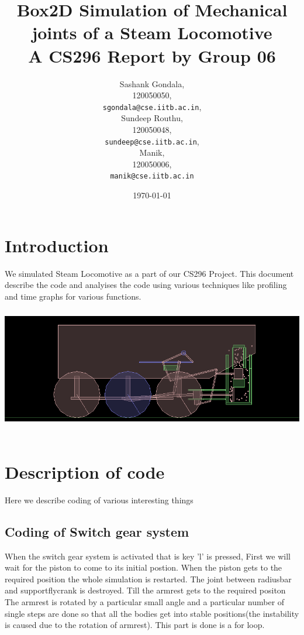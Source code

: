 \documentclass[11pt]{article}
\begin{document}
\title{Box2D Simulation of Mechanical joints of a Steam Locomotive \\ A CS296 Report by Group 06}
\author{Sashank Gondala,\\
	120050050,\\
	\texttt{sgondala@cse.iitb.ac.in},\\
	Sundeep Routhu,\\
	120050048,\\
	\texttt{sundeep@cse.iitb.ac.in},\\
	Manik,\\
	120050006,\\
	\texttt{manik@cse.iitb.ac.in}}
\date{\today}
\maketitle
\pagebreak
\section{Introduction}
We simulated Steam Locomotive\cite{steam} as a part of our CS296 Project. This document describe the code and analyises the code using various techniques like profiling and time graphs for various functions. \\
\includegraphics[width=15cm,height=6cm]{ActualImage.png}
\section{Description of code}
Here we describe coding of various interesting things

\subsection{Coding of Switch gear system}
When the switch gear system is activated that is key 'l' is pressed, First we will wait for the piston to come to its initial postion. When the piston gets to the required position the whole simulation is restarted. The joint between radiusbar and supportflycrank is destroyed. Till the armrest gets to the required positon The armrest is rotated by a particular small angle and a particular number of single steps are done so that all the bodies get into stable positions(the instability is caused due to the rotation of armrest). This part is done is a for loop.
\end{document}
